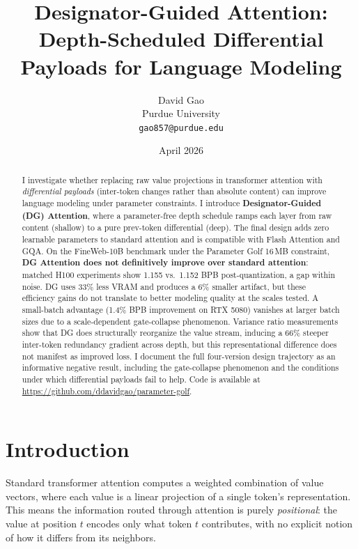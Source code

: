 \documentclass[11pt]{article}
\title{Designator-Guided Attention:\\Depth-Scheduled Differential Payloads for Language Modeling}
\author{David Gao\\Purdue University\\\texttt{gao857@purdue.edu}}
\date{April 2026}
\begin{document}
\maketitle

\begin{abstract}
I investigate whether replacing raw value projections in transformer attention with \emph{differential payloads} (inter-token changes rather than absolute content) can improve language modeling under parameter constraints. I introduce \textbf{Designator-Guided (DG) Attention}, where a parameter-free depth schedule ramps each layer from raw content (shallow) to a pure prev-token differential (deep). The final design adds zero learnable parameters to standard attention and is compatible with Flash Attention and GQA. On the FineWeb-10B benchmark under the Parameter Golf 16\,MB constraint, \textbf{DG Attention does not definitively improve over standard attention}: matched H100 experiments show 1.155 vs.\ 1.152 BPB post-quantization, a gap within noise. DG uses 33\% less VRAM and produces a 6\% smaller artifact, but these efficiency gains do not translate to better modeling quality at the scales tested. A small-batch advantage (1.4\% BPB improvement on RTX 5080) vanishes at larger batch sizes due to a scale-dependent gate-collapse phenomenon. Variance ratio measurements show that DG does structurally reorganize the value stream, inducing a 66\% steeper inter-token redundancy gradient across depth, but this representational difference does not manifest as improved loss. I document the full four-version design trajectory as an informative negative result, including the gate-collapse phenomenon and the conditions under which differential payloads fail to help. Code is available at \url{https://github.com/ddavidgao/parameter-golf}.
\end{abstract}

\section{Introduction}
\label{sec:intro}

Standard transformer attention \citep{vaswani2017attention} computes a weighted combination of value vectors, where each value is a linear projection of a single token's representation. This means the information routed through attention is purely \emph{positional}: the value at position $t$ encodes only what token $t$ contributes, with no explicit notion of how it differs from its neighbors.
\end{document}
